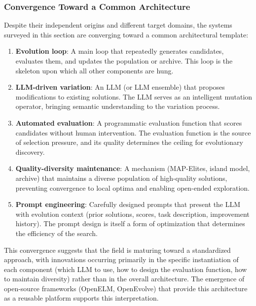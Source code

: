 \subsubsection{Convergence Toward a Common Architecture}

Despite their independent origins and different target domains, the systems surveyed in this section are converging toward a common architectural template:

\begin{enumerate}
\item \textbf{Evolution loop}: A main loop that repeatedly generates candidates, evaluates them, and updates the population or archive. This loop is the skeleton upon which all other components are hung.

\item \textbf{LLM-driven variation}: An LLM (or LLM ensemble) that proposes modifications to existing solutions. The LLM serves as an intelligent mutation operator, bringing semantic understanding to the variation process.

\item \textbf{Automated evaluation}: A programmatic evaluation function that scores candidates without human intervention. The evaluation function is the source of selection pressure, and its quality determines the ceiling for evolutionary discovery.

\item \textbf{Quality-diversity maintenance}: A mechanism (MAP-Elites, island model, archive) that maintains a diverse population of high-quality solutions, preventing convergence to local optima and enabling open-ended exploration.

\item \textbf{Prompt engineering}: Carefully designed prompts that present the LLM with evolution context (prior solutions, scores, task description, improvement history). The prompt design is itself a form of optimization that determines the efficiency of the search.
\end{enumerate}

This convergence suggests that the field is maturing toward a standardized approach, with innovations occurring primarily in the specific instantiation of each component (which LLM to use, how to design the evaluation function, how to maintain diversity) rather than in the overall architecture. The emergence of open-source frameworks (OpenELM, OpenEvolve) that provide this architecture as a reusable platform supports this interpretation.

